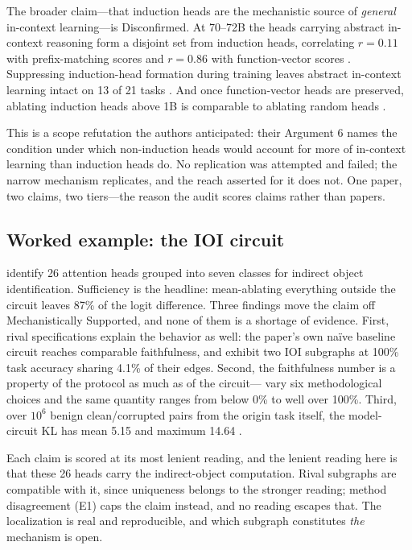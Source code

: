 \documentclass{article}
\begin{document}
The broader claim---that induction heads are the mechanistic source of \emph{general} in-context learning---is Disconfirmed. At 70--72B the heads carrying abstract in-context reasoning form a disjoint set from induction heads, correlating $r=0.11$ with prefix-matching scores and $r=0.86$ with function-vector scores \citep{webb2025emergent}. Suppressing induction-head formation during training leaves abstract in-context learning intact on 13 of 21 tasks \citep{sahin2025incontext}. And once function-vector heads are preserved, ablating induction heads above 1B is comparable to ablating random heads \citep{yin2025which}.

This is a scope refutation the authors anticipated: their Argument 6 names the condition under which non-induction heads would account for more of in-context learning than induction heads do. No replication was attempted and failed; the narrow mechanism replicates, and the reach asserted for it does not. One paper, two claims, two tiers---the reason the audit scores claims rather than papers.

\subsection{Worked example: the IOI circuit}
\label{sec:example-ioi}

\citet{wang2023interpretability} identify 26 attention heads grouped into seven classes for indirect object identification. Sufficiency is the headline: mean-ablating everything outside the circuit leaves 87\% of the logit difference. Three findings move the claim off Mechanistically Supported, and none of them is a shortage of evidence. First, rival specifications explain the behavior as well: the paper's own na\"ive baseline circuit reaches comparable faithfulness, and \citet{chen2026circuits} exhibit two IOI subgraphs at 100\% task accuracy sharing 4.1\% of their edges. Second, the faithfulness number is a property of the protocol as much as of the circuit---\citet{miller2024transformer} vary six methodological choices and the same quantity ranges from below 0\% to well over 100\%. Third, over $10^6$ benign clean/corrupted pairs from the origin task itself, the model-circuit KL has mean 5.15 and maximum 14.64 \citep{uitdebos2024adversarial}.

Each claim is scored at its most lenient reading, and the lenient reading here is that these 26 heads carry the indirect-object computation. Rival subgraphs are compatible with it, since uniqueness belongs to the stronger reading; method disagreement (E1) caps the claim instead, and no reading escapes that. The localization is real and reproducible, and which subgraph constitutes \emph{the} mechanism is open.
\end{document}
